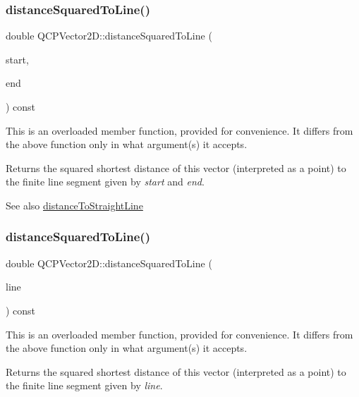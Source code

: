 \subsubsection{\texorpdfstring{distanceSquaredToLine()}{distanceSquaredToLine()}\hspace{0.1cm}{\footnotesize\ttfamily [1/2]}}
{\footnotesize\ttfamily double Q\+C\+P\+Vector2\+D\+::distance\+Squared\+To\+Line (\begin{DoxyParamCaption}\item[{const \mbox{\hyperlink{class_q_c_p_vector2_d}{Q\+C\+P\+Vector2D}} \&}]{start,  }\item[{const \mbox{\hyperlink{class_q_c_p_vector2_d}{Q\+C\+P\+Vector2D}} \&}]{end }\end{DoxyParamCaption}) const}

This is an overloaded member function, provided for convenience. It differs from the above function only in what argument(s) it accepts.

Returns the squared shortest distance of this vector (interpreted as a point) to the finite line segment given by {\itshape start} and {\itshape end}.

\begin{DoxySeeAlso}{See also}
\mbox{\hyperlink{class_q_c_p_vector2_d_ae240b845c3744e43a5d0aa7b2bb66c19}{distance\+To\+Straight\+Line}} 
\end{DoxySeeAlso}
\mbox{\label{class_q_c_p_vector2_d_a0c44ca97d46ee04feec32c1c57e70831}} 
\subsubsection{\texorpdfstring{distanceSquaredToLine()}{distanceSquaredToLine()}\hspace{0.1cm}{\footnotesize\ttfamily [2/2]}}
{\footnotesize\ttfamily double Q\+C\+P\+Vector2\+D\+::distance\+Squared\+To\+Line (\begin{DoxyParamCaption}\item[{const Q\+LineF \&}]{line }\end{DoxyParamCaption}) const}

This is an overloaded member function, provided for convenience. It differs from the above function only in what argument(s) it accepts.

Returns the squared shortest distance of this vector (interpreted as a point) to the finite line segment given by {\itshape line}.

